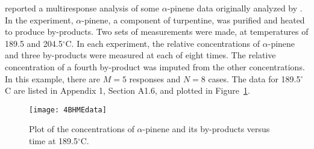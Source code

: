\begin{example}\label{pin:model}
 reported a multiresponse analysis of some
$\alpha$-pinene data originally analyzed by
.
In the experiment, $\alpha$-pinene, a component of turpentine, was
purified and heated to produce by-products.
Two sets of measurements were made, at temperatures of 189.5
and 204.5$^\circ$C.
In each experiment, the relative concentrations of $\alpha$-pinene
and three by-products were measured at each of eight times.
The relative concentration of a fourth by-product was imputed
from the other concentrations.
In this example, there are $M = 5$ responses and $N = 8$ cases.
The data for 189.5$^\circ$C are listed
in Appendix 1, Section A1.6, and plotted in Figure~\ref{fig:BHMEdata}.
  \begin{figure}
    \centerline{\texttt{[image: 4BHMEdata]}}%
    \caption{\label{fig:BHMEdata}
    Plot of the concentrations of
    $\alpha$-pinene and its by-products versus time at 189.5$^\circ$C.
    }
  \end{figure}
\end{example}

